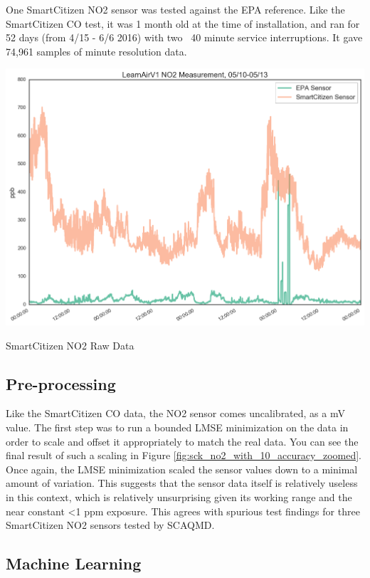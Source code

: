 One SmartCitizen NO2 sensor was tested against the EPA reference.  Like the SmartCitizen CO test, it was 1 month old at the time of installation, and ran for 52 days (from 4/15 - 6/6 2016) with two ~40 minute service interruptions.  It gave 74,961 samples of minute resolution data.

\begin{marginfigure}
 	\includegraphics[width=\textwidth]{figs/no2_sck_zoomed}               
 	 \caption{SmartCitizen NO2 Raw Data}
  	\label{fig:sck_no2_raw_zoomed}
\end{marginfigure}

\subsection{Pre-processing}

\enlargethispage{\baselineskip}

Like the SmartCitizen CO data, the NO2 sensor comes uncalibrated, as a mV value.  The first step was to run a bounded LMSE minimization on the data in order to scale and offset it appropriately to match the real data.  You can see the final result of such a scaling in Figure \ref{fig:sck_no2_with_10_accuracy_zoomed}.  Once again, the LMSE minimization scaled the sensor values down to a minimal amount of variation.  This suggests that the sensor data itself is relatively useless in this context, which is relatively unsurprising given its working range and the near constant <1 ppm exposure.  This agrees with spurious test findings for three SmartCitizen NO2 sensors tested by SCAQMD.   


\subsection{Machine Learning}

